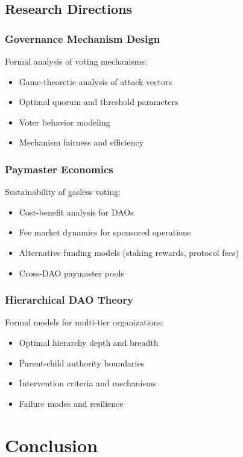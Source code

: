 \documentclass[11pt,a4paper]{article}
\begin{document}
\subsection{Research Directions}

\subsubsection{Governance Mechanism Design}

Formal analysis of voting mechanisms:
\begin{itemize}
    \item Game-theoretic analysis of attack vectors
    \item Optimal quorum and threshold parameters
    \item Voter behavior modeling
    \item Mechanism fairness and efficiency
\end{itemize}

\subsubsection{Paymaster Economics}

Sustainability of gasless voting:
\begin{itemize}
    \item Cost-benefit analysis for DAOs
    \item Fee market dynamics for sponsored operations
    \item Alternative funding models (staking rewards, protocol fees)
    \item Cross-DAO paymaster pools
\end{itemize}

\subsubsection{Hierarchical DAO Theory}

Formal models for multi-tier organizations:
\begin{itemize}
    \item Optimal hierarchy depth and breadth
    \item Parent-child authority boundaries
    \item Intervention criteria and mechanisms
    \item Failure modes and resilience
\end{itemize}

\section{Conclusion}
\end{document}

